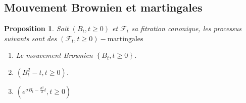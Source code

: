 \documentclass[A4paper,12pt]{report}
\newtheorem{proposition}{Proposition}[chapter]
\begin{document}
\subsection{Mouvement Brownien et martingales}
\begin{proposition}
Soit $\left(B_{t}, t\geq0 \right)$ et $\mathcal{F}_t$ sa fitration canonique, les processus suivants sont des $\left(\mathcal{F}_t, t\geq0\right)-\text{martingales}$
  \begin{enumerate}
  \item Le mouvement Brownien $\left\{B_{t}, t \geq 0\right\}$.
  \item $\left(B_{t}^{2}-t, t \geq 0\right)$.
  \item $\left(e^{\sigma B_t -\frac{\sigma^2}{2}t }, t\geq0 \right)$
  \end{enumerate}
\end{proposition}
\end{document}
